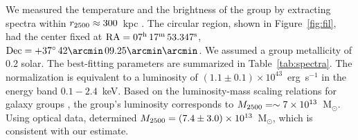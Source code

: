 We measured the temperature and the brightness of the group by extracting spectra within $r_{\rm 2500} \approx 300$~kpc \citep{Medezinski2013}. The circular region, shown in Figure~\ref{fig:fil}, had the center fixed at ${\rm RA} = 07^{\rm h}\, 17^{\rm m}\, 53.347^{\rm s}$, ${\rm Dec} = +37^{\circ}\, 42\arcmin \, 09.25\arcmin\arcmin$. We assumed a group metallicity of 0.2 solar. The best-fitting parameters are summarized in Table~\ref{tab:spectra}. The normalization is equivalent to a luminosity of $(1.1\pm 0.1) \times 10^{43}$~erg~s$^{-1}$ in the energy band $0.1-2.4$~keV. Based on the luminosity-mass scaling relations for galaxy groups \citep[e.g.,][]{Connor2014}, the group's luminosity corresponds to $M_{\rm 2500} = \sim 7\times 10^{13}$~M$_\odot$. Using optical data, \citet{Medezinski2013} determined $M_{\rm 2500} = (7.4\pm 3.0) \times 10^{13}$~M$_\odot$, which is consistent with our estimate.